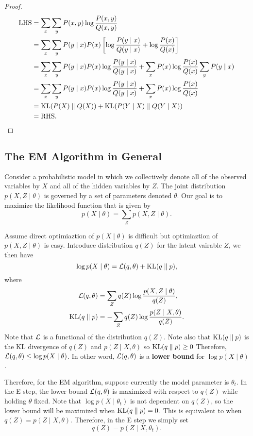 \documentclass[a4paper]{article}
\begin{document}
\begin{proof}
\[
\begin{aligned}
  \text{LHS} &= \sum_x \sum_y P(x,y) \log \frac{P(x,y)}{Q(x,y)} \\
  &= \sum_x \sum_y P(y \mid x) P(x) \left[ \log
  \frac{P(y \mid x)}{Q(y \mid x)} + \log \frac{P(x)}{Q(x)} \right] \\
  &= \sum_x \sum_y P(y \mid x) P(x) \log
  \frac{P(y \mid x)}{Q(y \mid x)} + \sum_x P(x) \log
  \frac{P(x)}{Q(x)} \sum_y P(y \mid x) \\
  &= \sum_x \sum_y P(y \mid x) P(x) \log \frac{P(y \mid x)}
  {Q(y \mid x)} + \sum_x P(x) \log \frac{P(x)}{Q(x)} \\
  &= \operatorname{KL}({P(X)} \; \Vert \; {Q(X)}) + \operatorname{KL}({P(Y \mid X)} \; \Vert \; {Q(Y \mid X)}) \\
  &= \text{RHS}.
\end{aligned}
\]
\end{proof}

\subsection{The EM Algorithm in General}

Consider a probabilistic model in which we collectively
denote all of the observed variables by $X$ and all of
the hidden variables by $Z$. The joint distribution
$p(X, Z \mid \theta)$ is governed by a set of parameters
denoted $\theta$. Our goal is to maximize the likelihood
function that is given by
\[
p(X \mid \theta) = \sum_Z p(X, Z \mid \theta).
\]

Assume direct optimiaztion of $p(X \mid \theta)$ is difficult
but optimiaztion of $p(X, Z \mid \theta)$ is easy.
Introduce distribution $q(Z)$ for the latent vairable $Z$,
we then have
\[
\log p(X \mid \theta) = \mathcal{L}(q, \theta) + \mathrm{KL}(q \; \Vert \; p),
\]
where
\[
\begin{aligned}
  \mathcal{L}(q, \theta) &= \sum_Z q(Z) \log \frac{p(X, Z \mid \theta)}{q(Z)}, \\
  \mathrm{KL}(q \; \Vert \; p) &= - \sum_Z q(Z) \log \frac{p(Z \mid X, \theta)}{q(Z)}.
\end{aligned}
\]
Note that $\mathcal{L}$ is a functional of the distribution $q(Z)$.
Note also that $\mathrm{KL}(q \; \Vert \; p)$ is the KL divergence of $q(Z)$
and $p(Z \mid X, \theta)$ so $\mathrm{KL}(q \; \Vert \; p) \geq 0$
Therefore, $\mathcal{L}(q, \theta) \leq \log p(X \mid \theta)$. In other word,
$\mathcal{L}(q, \theta)$ is a \textbf{lower bound}
for $\log p(X \mid \theta)$.

Therefore, for the EM algorithm, suppose currently the model
parameter is $\theta_t$. In the E step, the lower bound
$\mathcal{L}(q, \theta)$ is maximized with respect to $q(Z)$ while
holding $\theta$ fixed. Note that $\log p(X \mid \theta_t)$
is not dependent on $q(Z)$, so the lower bound will
be maximized when $\mathrm{KL}(q \; \Vert \; p) = 0$. This is equivalent to
when $q(Z) = p(Z \mid X, \theta)$. Therefore, in the E
step we simply set
\[
q(Z) = p(Z \mid X, \theta_t).
\]
\end{document}
